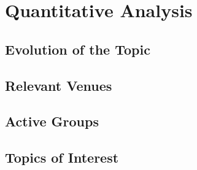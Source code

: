 \section{Quantitative Analysis\label{sec:sota.quanti}}

\subsection{Evolution of the Topic\label{sec:sota.quanti.time}}

\subsection{Relevant Venues\label{sec:sota.quanti.venues}}

\subsection{Active Groups\label{sec:sota.quanti.authors}}

\subsection{Topics of Interest\label{sec:sota.quanti.topics}}


